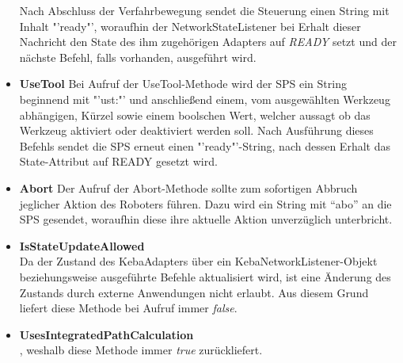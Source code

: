 \begin{itemize}
Nach Abschluss der Verfahrbewegung sendet die Steuerung einen String mit Inhalt "'ready"', woraufhin der NetworkStateListener bei Erhalt dieser Nachricht den State des ihm zugehörigen Adapters auf \textit{READY} setzt und der nächste Befehl, falls vorhanden, ausgeführt wird.
\item \textbf{UseTool}
\newline
Bei Aufruf der UseTool-Methode wird der SPS ein String beginnend mit "'ust:"' und anschließend einem, vom ausgewählten Werkzeug abhängigen, Kürzel sowie einem boolschen Wert, welcher aussagt ob das Werkzeug aktiviert oder deaktiviert werden soll. Nach Ausführung dieses Befehls sendet die SPS erneut einen "'ready"'-String, nach dessen Erhalt das State-Attribut auf READY gesetzt wird. 
\item \textbf{Abort}
\newline
Der Aufruf der Abort-Methode sollte zum sofortigen Abbruch jeglicher Aktion des Roboters führen. Dazu wird ein String mit “abo” an die SPS gesendet, woraufhin diese ihre aktuelle Aktion unverzüglich unterbricht. 
\item \textbf{IsStateUpdateAllowed}\\
Da der Zustand des KebaAdapters über ein KebaNetworkListener-Objekt beziehungsweise ausgeführte Befehle aktualisiert wird, ist eine Änderung des Zustands durch externe Anwendungen nicht erlaubt. Aus diesem Grund liefert diese Methode bei Aufruf immer \textit{false}.
\item \textbf{UsesIntegratedPathCalculation}\\
, weshalb diese Methode immer \textit{true} zurückliefert.
\end{itemize}